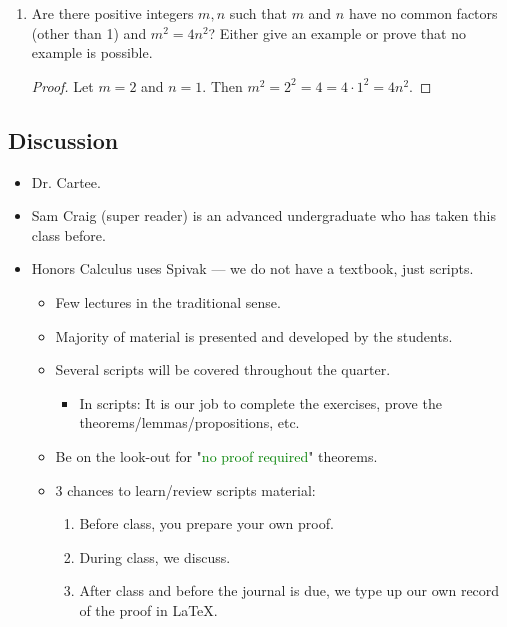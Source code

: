 \documentclass[../main.tex]{subfiles}
\begin{document}
\begin{exerciseM}
\begin{enumerate}[label={\alph*)}]
\begin{proof}
        \end{proof}
        \item Are there positive integers $m,n$ such that $m$ and $n$ have no common factors (other than 1) and $m^2=4n^2$? Either give an example or prove that no example is possible.
        \begin{proof}
            Let $m=2$ and $n=1$. Then $m^2=2^2=4=4\cdot 1^2=4n^2$.
        \end{proof}
    \end{enumerate}
\end{exerciseM}


\subsection{Discussion}
\begin{itemize}
    \item {}Dr. Cartee.
    \item Sam Craig (super reader) is an advanced undergraduate who has taken this class before.
    \item Honors Calculus uses Spivak --- we do not have a textbook, just scripts.
    \begin{itemize}
        \item Few lectures in the traditional sense.
        \item Majority of material is presented and developed by the students.
        \item Several scripts will be covered throughout the quarter.
        \begin{itemize}
            \item In scripts: It is our job to complete the exercises, prove the theorems/lemmas/propositions, etc.
        \end{itemize}
        \item Be on the look-out for "\textcolor{green}{no proof required}" theorems.
        \item 3 chances to learn/review scripts material:
        \begin{enumerate}
            \item Before class, you prepare your own proof.
            \item During class, we discuss.
            \item After class and before the journal is due, we type up our own record of the proof in \LaTeX.
        \end{enumerate}
    \end{itemize}

\end{itemize}
\end{document}
